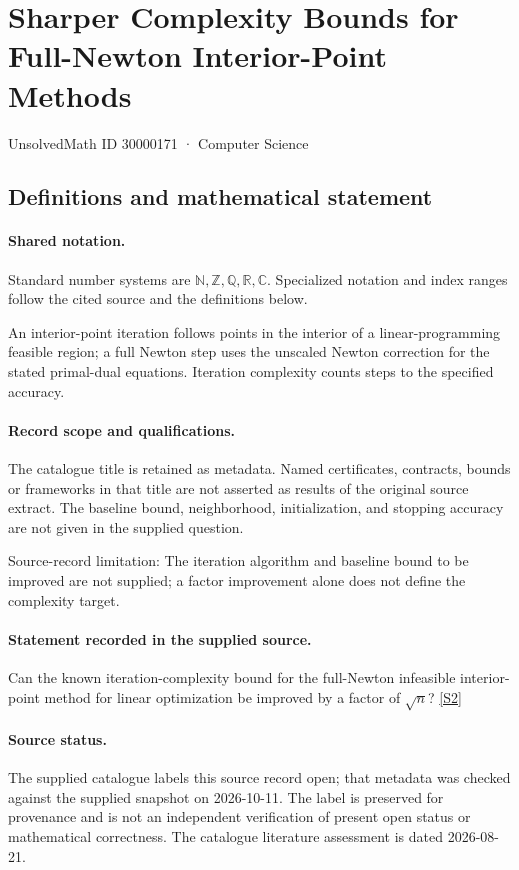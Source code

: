 \documentclass[11pt]{article}
\newcommand{\sref}[2]{\hyperlink{source:#1:#2}{[S#2]}}
\begin{document}
\setcounter{section}{30000170}
\section{Sharper Complexity Bounds for Full-Newton Interior-Point Methods}\label{30000171}
{\small\sffamily UnsolvedMath ID 30000171 · Computer Science}
\subsection{Definitions and mathematical statement}

\paragraph{Shared notation.}Standard number systems are $\mathbb N,\mathbb Z,\mathbb Q,\mathbb R,\mathbb C$. Specialized notation and index ranges follow the cited source and the definitions below.


An interior-point iteration follows points in the interior of a linear-programming feasible region; a full Newton step uses the unscaled Newton correction for the stated primal-dual equations. Iteration complexity counts steps to the specified accuracy.
\paragraph{Record scope and qualifications.}
The catalogue title is retained as metadata. Named certificates, contracts, bounds or frameworks in that title are not asserted as results of the original source extract.
The baseline bound, neighborhood, initialization, and stopping accuracy are not given in the supplied question.

Source-record limitation: The iteration algorithm and baseline bound to be improved are not supplied; a factor improvement alone does not define the complexity target.
\paragraph{Statement recorded in the supplied source.}
Can the known iteration-complexity bound for the full-Newton infeasible interior-point method for linear optimization be improved by a factor of $\sqrt n$? \sref{30000171}{2}
\paragraph{Source status.}
The supplied catalogue labels this source record open; that metadata was checked against the supplied snapshot on 2026-10-11. The label is preserved for provenance and is not an independent verification of present open status or mathematical correctness. The catalogue literature assessment is dated 2026-08-21.
\end{document}
